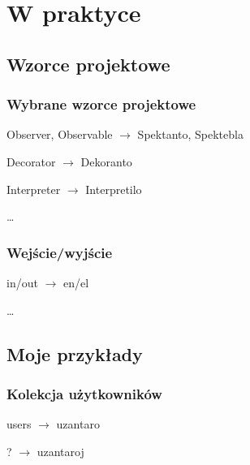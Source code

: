 \documentclass{beamer}
\begin{document}
%  	
%
 
  \section{W praktyce}
  \subsection{Wzorce projektowe}
  
\begin{frame}
	\frametitle{Wybrane wzorce projektowe}
	
	\begin{block}{}
		Observer, Observable $\rightarrow$ Spektanto, Spektebla
	\end{block}
	
	\begin{block}{}
		Decorator $\rightarrow$ Dekoranto
	\end{block}
	
	\begin{block}{}
		Interpreter $\rightarrow$ Interpretilo
	\end{block}
	
	\dots
\end{frame}  

\begin{frame}
	\frametitle{Wejście/wyjście}
	
	\begin{block}{}
		in/out $\rightarrow$ en/el
	\end{block}
	
	\dots
\end{frame}  
    
  \subsection{Moje przykłady}
  
  \begin{frame}
  	\frametitle{Kolekcja użytkowników}

	\begin{block}{}
		users $\rightarrow$ uzantaro
	\end{block}
	\begin{block}{}
		? $\rightarrow$ uzantaroj
	\end{block}
	
  \end{frame}
  
\end{document}
